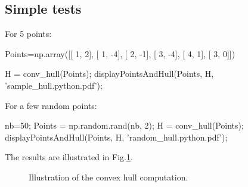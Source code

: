 \subsection{Simple tests}
For 5 points:
\begin{python}
Points=np.array([[ 1,  2],
       [ 1, -4],
       [ 2, -1],
       [ 3, -4],
       [ 4,  1],
       [ 3,  0]])

H = conv_hull(Points);
displayPointsAndHull(Points, H, 'sample_hull.python.pdf');
\end{python}

For a few random points:
\begin{python}
nb=50;
Points = np.random.rand(nb, 2);
H = conv_hull(Points);
displayPointsAndHull(Points, H, 'random_hull.python.pdf');
\end{python}

The results are illustrated in Fig.\ref{fig:python:convexhull:res}.

\begin{figure}[htbp]
\centering\caption{Illustration of the convex hull computation.}%
\hfill
{}%
\label{fig:python:convexhull:res}%
\end{figure}


